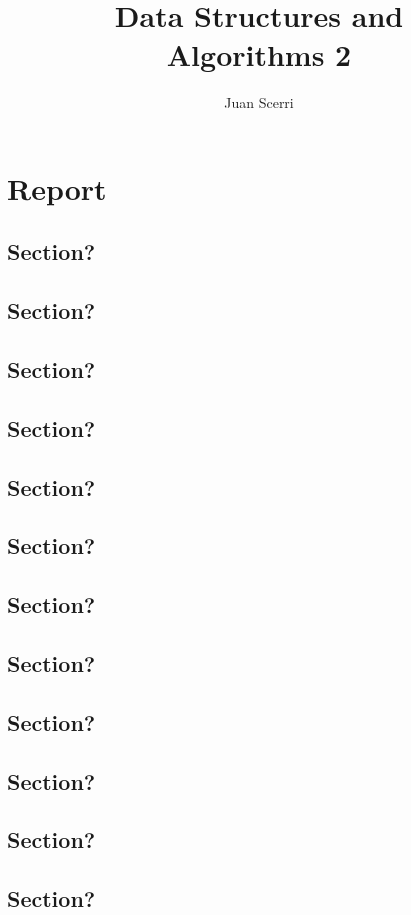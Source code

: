 \documentclass[article]{uom-coursework}
\title{Data Structures and\\Algorithms 2}
\author{Juan Scerri}
\begin{document}

\pagestyle{umpage}

\frontmatter

\maketitle %

\tableofcontents %

\clearpage

\lstlistoflistings

\mainmatter

\clearpage



\chapter*{Report}
\label{chap:report}

\section{Section?}
\section{Section?}
\section{Section?}
\section{Section?}
\section{Section?}
\section{Section?}
\section{Section?}
\section{Section?}
\section{Section?}
\section{Section?}
\section{Section?}
\section{Section?}


\blindtext
\blindtext
\blindtext
\end{document}
